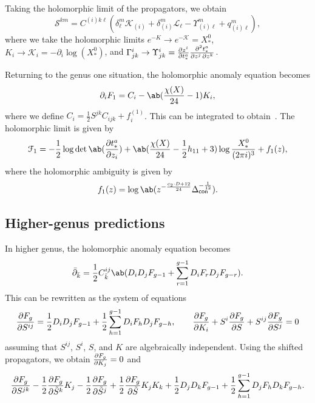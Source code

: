 \documentclass[10pt]{amsart}
\theoremstyle{definition}
\theoremstyle{remark}
\theoremstyle{plain}
\theoremstyle{definition}
\theoremstyle{remark}
\newcommand{\mc}[1]{\mathcal{#1}}
\newcommand{\ms}[1]{\mathsf{#1}}
\newcommand{\1}{\mathbf{1}}
\newcommand{\2}{\mathbf{2}}
\newcommand{\3}{\mathbf{3}}
\begin{document}
Taking the holomorphic limit of the propagators, we obtain
\[ \mc{S}^{km} = C^{(i)k\ell} (\delta_{\ell}^m \mc{K}_{(i)} + \delta_{(i)}^m \mc{L}_{\ell} - \Upsilon_{(i)\ell}^m + q_{(i)\ell}^m), \]
where we take the holomorphic limits
$e^{-K} \to e^{-\mc{K}} = X_*^0$, $K_i \to \mc{K}_i = -\partial_i \log(X_*^0)$, and $\Gamma_{jk}^i \to \Upsilon_{jk}^i = \pdv{z^i}{t_*^a} \pdv{t_*^a}{z^j,z^k}$. 

Returning to the genus one situation, the holomorphic anomaly equation becomes
\[ \partial_i F_1 = C_i - \ab(\frac{\chi(X)}{24}-1)K_i,\]
where we define $C_i = \frac{1}{2}S^{jk} C_{ijk} + f_i^{(1)}$. This can be integrated to obtain~. The holomorphic limit is given by
\[ \mc{F}_1 = -\frac{1}{2}\log \det \ab(\pdv{t_*^a}{z_i}) + \ab(\frac{\chi(X)}{24}- \frac{1}{2} h_{11} + 3)\log \frac{X_*^0}{(2\pi i)^3} + f_1(z), \]
where the holomorphic ambiguity is given by
\[ f_1(z) = \log \ab(z^{-\frac{c_2 \cdot D+12}{24}}\Delta_{\ms{con}}^{-\frac{1}{12}}). \]

\subsection{Higher-genus predictions}%
\label{sub:Higher-genus predictions}

In higher genus, the holomorphic anomaly equation becomes
\[ \bar{\partial}_{\bar{k}} = \frac{1}{2} C_{\bar{k}}^{ij} \ab(D_i D_jF_{g-1} + \sum_{r=1}^{g-1} D_i F_r D_j F_{g-r}). \]
This can be rewritten as the system of equations
\[ \pdv{F_g}{S^{ij}} = \frac{1}{2} D_i D_j F_{g-1} +\frac{1}{2}\sum_{h=1}^{g-1} D_i F_h D_j F_{g-h}, \qquad \pdv{F_g}{K_i} + S^i \pdv{F_g}{S} + S^{ij}\pdv{F_g}{S^j} = 0 \]
assuming that $S^{ij}$, $S^i$, $S$, and $K$ are algebraically independent. Using the shifted propagators, we obtain $\pdv{F_g}{K_j} = 0$ and
\[ \pdv{F_g}{S^{jk}} - \frac{1}{2} \pdv{F_g}{\tilde{S}^k} K_j - \frac{1}{2} \pdv{F_g}{\tilde{S}^j} + \frac{1}{2} \pdv{F_g}{\tilde{S}} K_j K_k + \frac{1}{2} D_j D_k F_{g-1} + \frac{1}{2} \sum_{h=1}^{g-1} D_j F_h D_k F_{g-h}. \]
\end{document}
